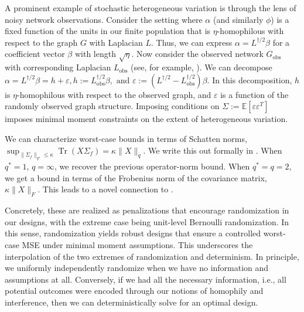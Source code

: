 \documentclass[12pt]{article}
\theoremstyle{definition}
\numberwithin{equation}{section}
\numberwithin{figure}{section}
\numberwithin{equation}{section}
\numberwithin{figure}{section}
\begin{document}
\begin{example}\label{example:noisy_misspecification}
    A prominent example of stochastic heterogeneous variation is through the lens of noisy network observations. Consider the setting where $\alpha$ (and similarly $\phi$) is a fixed function of the units in our finite population that is $\eta$-homophilous with respect to the graph $G$ with Laplacian $L$. Thus, we can express $\alpha = L^{\dagger/2} \beta$ for a coefficient vector $\beta$ with length $\sqrt{\eta}$. Now consider the observed network $G_{\text{obs}}$ with corresponding Laplacian $L_{\text{obs}}$ (see, for example, ). We can decompose
    $\alpha = L^{\dagger/2} \beta = h + \varepsilon, h:= L_{\text{obs}}^{\dagger/2} \beta, \text{ and } \varepsilon := (L^{\dagger/2} -L_{\text{obs}}^{\dagger/2}) \beta$.
    In this decomposition, $h$ is $\eta$-homophilous with respect to the observed graph, and $\varepsilon$ is a function of the randomly observed graph structure. Imposing conditions on $\Sigma := \mathbb{E}[\varepsilon \varepsilon^T]$ imposes minimal moment constraints on the extent of heterogeneous variation.
\end{example}

We can characterize worst-case bounds in terms of Schatten norms, $\sup_{\|\Sigma_f\|_{q^\star} \leq \kappa} \operatorname{Tr}(X\Sigma_f) = \kappa \|X\|_{q}.$
We write this out formally in . When $q^* = 1,\, q= \infty$, we recover the previous operator-norm bound.
When $q^*=q=2$, we get a bound in terms of the Frobenius norm of the covariance matrix, $\kappa \| X \|_F$. This leads to a novel connection to \citet{viviano2023causal}. 

Concretely, these are realized as penalizations that encourage randomization in our designs, with the extreme case being unit-level Bernoulli randomization.
In this sense, randomization yields robust designs that ensure a controlled worst-case MSE under minimal moment assumptions. This underscores the interpolation of the two extremes of randomization and determinism. In principle, we uniformly independently randomize when we have no information and assumptions at all. 
Conversely, if we had all the necessary information, i.e., all potential outcomes were encoded through our notions of homophily and interference, then we can deterministically solve for an optimal design. 
\end{document}
